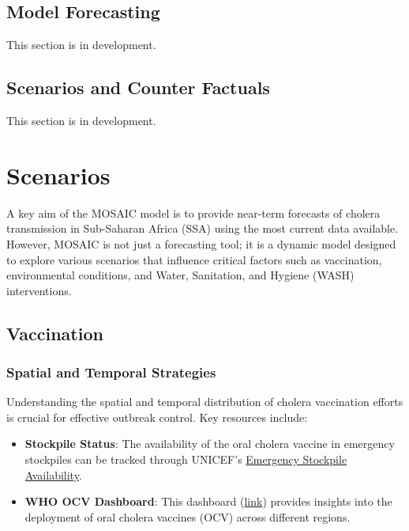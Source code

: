 \documentclass[
]{book}
\providecommand{\tightlist}{%
  \setlength{\itemsep}{0pt}\setlength{\parskip}{0pt}}
\begin{document}
\section{Model Forecasting}\label{model-forecasting}

This section is in development.

\section{Scenarios and Counter Factuals}\label{scenarios-and-counter-factuals}

This section is in development.

\chapter{Scenarios}\label{scenarios}

A key aim of the MOSAIC model is to provide near-term forecasts of cholera transmission in Sub-Saharan Africa (SSA) using the most current data available. However, MOSAIC is not just a forecasting tool; it is a dynamic model designed to explore various scenarios that influence critical factors such as vaccination, environmental conditions, and Water, Sanitation, and Hygiene (WASH) interventions.

\section{Vaccination}\label{vaccination}

\subsection{Spatial and Temporal Strategies}\label{spatial-and-temporal-strategies}

Understanding the spatial and temporal distribution of cholera vaccination efforts is crucial for effective outbreak control. Key resources include:

\begin{itemize}
\tightlist
\item
  \textbf{Stockpile Status}: The availability of the oral cholera vaccine in emergency stockpiles can be tracked through UNICEF's \href{https://www.unicef.org/supply/documents/emergency-stockpile-availability-oral-cholera-vaccine}{Emergency Stockpile Availability}.
\item
  \textbf{WHO OCV Dashboard}: This dashboard (\href{https://app.powerbi.com/view?r=eyJrIjoiYmFmZTBmM2EtYWM3Mi00NWYwLTg3YjgtN2Q0MjM5ZmE1ZjFkIiwidCI6ImY2MTBjMGI3LWJkMjQtNGIzOS04MTBiLTNkYzI4MGFmYjU5MCIsImMiOjh9}{link}) provides insights into the deployment of oral cholera vaccines (OCV) across different regions.
\end{itemize}
\end{document}
